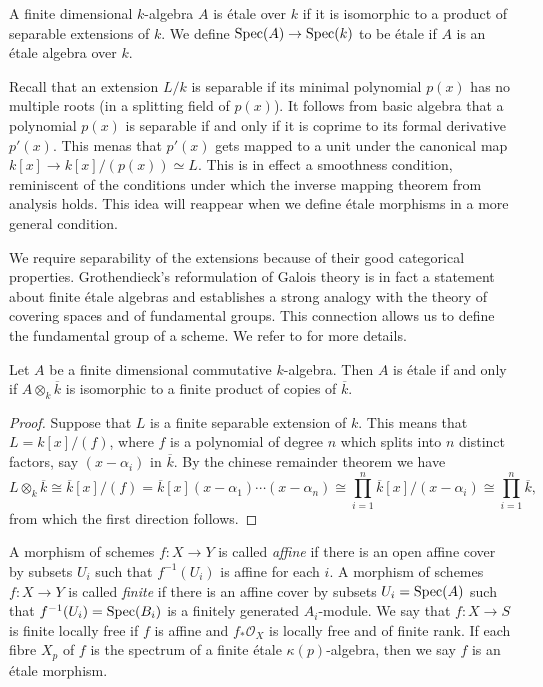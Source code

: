 \begin{definition}
  A finite dimensional $k$-algebra $A$ is \'etale over $k$ if it is isomorphic to a product of separable extensions of $k$. We define $\operatorname{Spec}(A) \to \operatorname{Spec}(k)$ to be \'etale if $A$ is an \'etale algebra over $k$.
\end{definition}
Recall that an extension $L/k$ is separable if its minimal polynomial $p(x)$ has no multiple roots (in a splitting field of $p(x)$). It follows from basic algebra that a polynomial $p(x)$ is separable if and only if it is coprime to its formal derivative $p'(x)$. This menas that $p'(x)$ gets mapped to a unit under the canonical map $k[x] \longrightarrow k[x]/(p(x)) \simeq L$. This is in effect a smoothness condition, reminiscent of the conditions under which the inverse mapping theorem from analysis holds. This idea will reappear when we define \'etale morphisms in a more general condition.

We require separability of the extensions because of their good categorical properties. Grothendieck's reformulation of Galois theory is in fact a statement about finite \'etale algebras and establishes a strong analogy with the theory of covering spaces and of fundamental groups. This connection allows us to define the fundamental group of a scheme. We refer to\cite{Szamuely} for more details.

\begin{theorem}
  Let $A$ be a finite dimensional commutative $k$-algebra. Then $A$ is \'etale if and only if $A \otimes_k \overline{k}$ is isomorphic to a finite product of copies of $\overline{k}$.
\end{theorem}
\begin{proof}
  Suppose that $L$ is a finite separable extension of $k$. This means that $L = k[x]/(f)$, where $f$ is a polynomial of degree $n$ which splits into $n$ distinct factors, say $(x-\alpha_i)$ in $\overline{k}$. By the chinese remainder theorem we have
  \[L \otimes_k \overline{k} \cong \overline{k}[x]/(f) = \overline{k}[x](x-\alpha_1)\cdots(x-\alpha_n) \cong \prod_{i=1}^n \overline{k}[x]/(x-\alpha_i) \cong \prod_{i=1}^n \overline{k},\] from which the first direction follows.
\end{proof}

\begin{definition}
A morphism of schemes $f: X \to Y$ is called \textit{affine} if there is an open affine cover by subsets $U_i$ such that $f^{-1}(U_i)$ is affine for each $i$.
A morphism of schemes $f: X \to Y$ is called \textit{finite} if there is an affine cover by subsets $U_i = \operatorname{Spec}(A)$ such that $f^{-1}(U_i) = \operatorname{Spec}(B_i)$ is a finitely generated $A_i$-module.
We say that $f: X \to S$ is finite locally free if $f$ is affine and $f_* \mathcal{O}_X$ is locally free and of finite rank. If each fibre $X_p$ of $f$ is the spectrum of a finite \'etale $\kappa(p)$-algebra, then we say $f$ is an \'etale morphism.
\end{definition}


